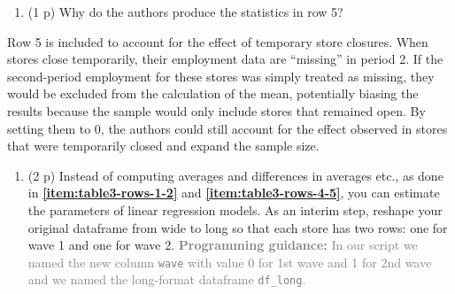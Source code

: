 \documentclass[
]{article}
\newenvironment{Shaded}{\begin{snugshade}}{\end{snugshade}}
\newcommand{\DecValTok}[1]{\textcolor[rgb]{0.00,0.00,0.81}{#1}}
\newcommand{\FunctionTok}[1]{\textcolor[rgb]{0.13,0.29,0.53}{\textbf{#1}}}
\newcommand{\NormalTok}[1]{#1}
\newcommand{\OtherTok}[1]{\textcolor[rgb]{0.56,0.35,0.01}{#1}}
\newcommand{\SpecialCharTok}[1]{\textcolor[rgb]{0.81,0.36,0.00}{\textbf{#1}}}
\newcommand{\StringTok}[1]{\textcolor[rgb]{0.31,0.60,0.02}{#1}}
\providecommand{\tightlist}{%
  \setlength{\itemsep}{0pt}\setlength{\parskip}{0pt}}
\begin{document}
\begin{enumerate}
\def\labelenumi{\alph{enumi}.}
\setcounter{enumi}{4}
\tightlist
\item
  (1 p) Why do the authors produce the statistics in row 5?
\end{enumerate}

Row 5 is included to account for the effect of temporary store closures.
When stores close temporarily, their employment data are ``missing'' in
period 2. If the second-period employment for these stores was simply
treated as missing, they would be excluded from the calculation of the
mean, potentially biasing the results because the sample would only
include stores that remained open. By setting them to 0, the authors
could still account for the effect observed in stores that were
temporarily closed and expand the sample size.

\begin{enumerate}
\def\labelenumi{\arabic{enumi}.}
\setcounter{enumi}{14}
\tightlist
\item
  (2 p) Instead of computing averages and differences in averages etc.,
  as done in \textbf{\ref{item:table3-rows-1-2}} and
  \textbf{\ref{item:table3-rows-4-5}}, you can estimate the parameters
  of linear regression models. As an interim step, reshape your original
  dataframe from wide to long so that each store has two rows: one for
  wave 1 and one for wave 2.
  \textcolor{gray}{\textbf{Programming guidance:} In our script we named the new column \texttt{wave} with value 0 for 1st wave and 1 for 2nd wave and we named the long-format dataframe \texttt{df\_long}.}\label{item:CK_longformat}
\end{enumerate}

\begin{Shaded}
\end{Shaded}
\end{document}
